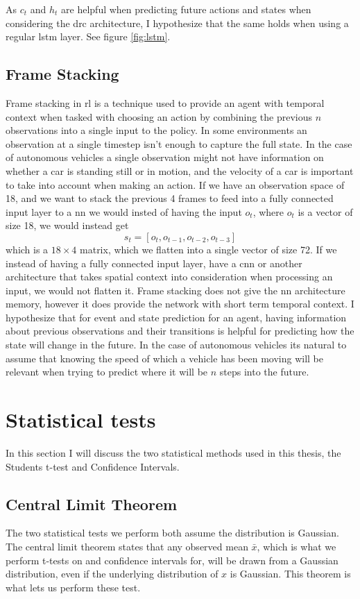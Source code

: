 \documentclass[UKenglish]{uiomasterthesis}
\begin{document}
As $c_t$ and $h_t$ are helpful when predicting future actions and states \cite{chung2024predictingfutureactionsreinforcement} when considering the \ac{drc} architecture, I hypothesize that the same holds when using a regular \ac{lstm} layer. See figure \ref{fig:lstm}.

\subsection{Frame Stacking}
Frame stacking in \ac{rl} is a technique used to provide an agent with temporal context when tasked with choosing an action by combining the previous $n$ observations into a single input to the policy. In some environments an observation at a single timestep isn't enough to capture the full state. In the case of autonomous vehicles a single observation might not have information on whether a car is standing still or in motion, and the velocity of a car is important to take into account when making an action.
If we have an observation space of 18, and we want to stack the previous 4 frames to feed into a fully connected input layer to a \ac{nn} we would insted of having the input $o_t$, where $o_t$ is a vector of size 18, we would instead get $$s_t = [o_t, o_{t-1}, o_{t-2}, o_{t-3}]$$ which is a $18\times4$ matrix, which we flatten into a single vector of size 72. If we instead of having a fully connected input layer, have a \ac{cnn} or another architecture that takes spatial context into consideration when processing an input, we would not flatten it.
Frame stacking does not give the \ac{nn} architecture memory, however it does provide the network with short term temporal context. I hypothesize that for event and state prediction for an agent, having information about previous observations and their transitions is helpful for predicting how the state will change in the future. In the case of autonomous vehicles its natural to assume that knowing the speed of which a vehicle has been moving will be relevant when trying to predict where it will be $n$ steps into the future.

\section{Statistical tests}
\label{sec:stat_meth}
In this section I will discuss the two statistical methods used in this thesis, the Students t-test and Confidence Intervals.

\subsection{Central Limit Theorem}
The two statistical tests we perform both assume the distribution is Gaussian. The central limit theorem states that any observed mean $\bar{x}$, which is what we perform t-tests on and confidence intervals for, will be drawn from a Gaussian distribution, even if the underlying distribution of $x$ is Gaussian\cite{clt}. This theorem is what lets us perform these test.
\end{document}
